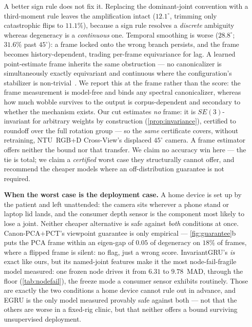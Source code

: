 \documentclass[10pt,twocolumn,letterpaper]{article}
\begin{document}
A better sign rule does not fix it. Replacing the dominant-joint convention with a third-moment rule
leaves the amplification intact ($12.1^\circ$, trimming only catastrophic flips to $11.1\%$), because a
sign rule resolves a \emph{discrete} ambiguity whereas degeneracy is a \emph{continuous} one. Temporal
smoothing is worse ($28.8^\circ$; $31.6\%$ past $45^\circ$): a frame locked onto the wrong branch
persists, and the frame becomes history-dependent, trading per-frame equivariance for lag. A learned point-estimate frame
inherits the same obstruction --- no canonicalizer is simultaneously exactly equivariant and continuous
where the configuration's stabilizer is non-trivial~\cite{kaba2023canon}. We report this at the frame
rather than the score: the frame measurement is model-free and binds any spectral canonicalizer,
whereas how much wobble survives to the output is corpus-dependent and secondary to whether the
mechanism exists. Our cut estimates \emph{no} frame: it is $SE(3)$-invariant for arbitrary weights by
construction (\cref{prop:invariance}), certified to roundoff over the full rotation group --- so the
\emph{same} certificate covers, without retraining, NTU~RGB+D Cross-View's displaced $45^\circ$
camera. A frame estimator offers neither the bound nor that transfer. We claim no accuracy win here
--- the tie is total; we claim a \emph{certified} worst case they structurally cannot offer, and
recommend the cheaper models where an off-distribution guarantee is not required.

\textbf{When the worst case is the deployment case.} A home device is set up by the patient and left
unattended: the camera sits wherever a phone stand or laptop lid lands, and the consumer depth sensor
is the component most likely to lose a joint. Neither cheaper alternative is safe against \emph{both}
conditions at once. Canon-PCA$+$PCT's viewpoint guarantee is only empirical --- \cref{fig:guarantee}b
puts the PCA frame within an eigen-gap of $0.05$ of degeneracy on $18\%$ of frames, where a flipped
frame is silent: no flag, just a wrong score. InvariantGRU's \emph{is} exact like ours, but its
named-joint features make it the most node-fail-fragile model measured: one frozen node drives it
from $6.31$ to $9.78$~MAD, through the floor (\cref{tab:nodefail}), the freeze mode a consumer sensor
exhibits routinely. Those are exactly the two conditions a home device cannot rule out in advance,
and EGRU is the only model measured provably safe against both --- not that the others are worse in a
fixed-rig clinic, but that neither offers a bound surviving unsupervised deployment.
\end{document}
